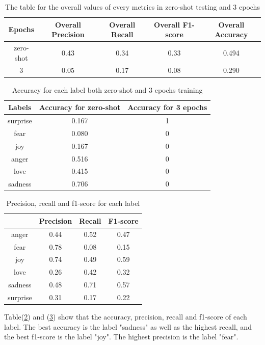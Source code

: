 \begin{table}[h!]
    \centering
    \begin{tabular}{|c|c|c|c|c|}\hline
          Epochs  & Overall Precision & Overall Recall & Overall F1-score & Overall Accuracy\\\hline
           zero-shot & 0.43 & 0.34 & 0.33 & 0.494\\\hline
           3 & 0.05 & 0.17 & 0.08 & 0.290\\\hline
    \end{tabular}
    \caption{The table for the overall values of every metrics in zero-shot testing and 3 epochs}
    \label{tab:overall_metrics_llama2}
\end{table}

\begin{table}[h!]
    \centering
    \begin{tabular}{c|c|c}
       Labels  & Accuracy for zero-shot & Accuracy for 3 epochs\\\hline
        surprise & 0.167 & 1\\
        fear & 0.080 &  0\\
        joy & 0.167 & 0 \\
        anger & 0.516 &  0\\
        love & 0.415 & 0 \\
        sadness & 0.706 &  0\\
    \end{tabular}
    \caption{Accuracy for each label both zero-shot and 3 epochs training}
    \label{tab:acc_each_labels_llama2}
\end{table}

\begin{table}[h!]
    \centering
    \begin{tabular}{c|c|c|c}
         & Precision & Recall & F1-score\\\hline
         anger & 0.44 & 0.52 & 0.47 \\
         fear & 0.78 & 0.08 &  0.15 \\
         joy & 0.74 & 0.49 & 0.59 \\
         love & 0.26 & 0.42 & 0.32\\
         sadness & 0.48 & 0.71 & 0.57\\
         surprise & 0.31 & 0.17 & 0.22\\
    \end{tabular}
    \caption{Precision, recall and f1-score for each label}
    \label{tab:class_rep_llama2}
\end{table}
\bigskip
\bigskip
\bigskip
\bigskip
\bigskip
\bigskip
\bigskip
Table(\ref{tab:acc_each_labels_llama2}) and (\ref{tab:class_rep_llama2}) show that the accuracy, precision, recall and f1-score of each label. The best accuracy is the label "sadness" as well as the highest recall, and the best f1-score is the label "joy". The highest precision is the label "fear".


